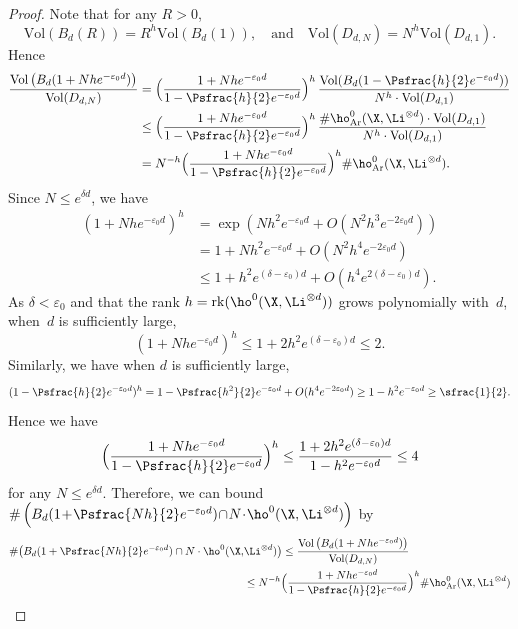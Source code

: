 \begin{proof}[Proof]
Note that for any $R>0$,
\[
\mathrm{Vol}\left(B_d(R)\right)=R^h\mathrm{Vol}\left(B_d(1)\right),
\quad\text{and}\quad
\mathrm{Vol}(D_{d,N})=N^{h} \mathrm{Vol}(D_{d,1}).
\]
Hence
\begin{align*}
\frac{\mathrm{Vol} \left(B_d(1+Nhe^{-\varepsilon_0 d}) \right)}{\mathrm{Vol}(D_{d,N})}
&=\Bigl(\frac{1+Nhe^{-\varepsilon_0 d}}{1-\Psfrac{h}{2}e^{-\varepsilon_0 d}}\Bigr)^h\,\frac{\mathrm{Vol}(B_d(1-\Psfrac{h}{2}e^{-\varepsilon_0 d}))}{N^h\cdot\mathrm{Vol}(D_{d,1})} \\
&\leq\Bigl(\frac{1+Nhe^{-\varepsilon_0 d}}{1-\Psfrac{h}{2}e^{-\varepsilon_0 d}}\Bigr)^h\,\frac{\#\ho^0_{\mathrm{Ar}}(\X,\Li^{\otimes d})\cdot \mathrm{Vol}(D_{d,1})}{N^{h}\cdot\mathrm{Vol}(D_{d,1})}\\
&=N^{-h}\Bigl(\frac{1+Nhe^{-\varepsilon_0 d}}{1-\Psfrac{h}{2}e^{-\varepsilon_0 d}}\Bigr)^h\#\ho^0_{\mathrm{Ar}}(\X,\Li^{\otimes d}).
\end{align*}
Since $N\leq e^{\delta d}$, we have
\begin{align*}
(1+Nhe^{-\varepsilon_0 d})^h &=\exp\left(Nh^2e^{-\varepsilon_0 d}+ O(N^2h^3e^{-2\varepsilon_0 d})\right)\\
&= 1+Nh^2e^{-\varepsilon_0 d}+O(N^2h^4e^{-2\varepsilon_0 d}) \\
&\leq 1+h^2e^{(\delta-\varepsilon_0) d}+O(h^4e^{2(\delta-\varepsilon_0) d}).
\end{align*}
As $\delta<\varepsilon_0$ and that the rank $h=\mathrm{rk}(\ho^0(\X,\Li^{\otimes d}))$ grows polynomially with~$d$, when~$d$ is sufficiently large,
\[
(1+Nhe^{-\varepsilon_0 d})^h \leq 1+2h^2e^{(\delta-\varepsilon_0) d}\leq 2.
\]
Similarly, we have when $d$ is sufficiently large,
\[
(1-\Psfrac{h}{2}e^{-\varepsilon_0 d})^h =1-\Psfrac{h^2}{2}e^{-\varepsilon_0 d}+O(h^4e^{-2\varepsilon_0 d})\geq 1-h^2e^{-\varepsilon_0 d}\geq \sfrac{1}{2}.
\]
Hence we have
\[
\Bigl(\frac{1+Nhe^{-\varepsilon_0 d}}{1-\Psfrac{h}{2}e^{-\varepsilon_0 d}}\Bigr)^h \leq \frac{1+2h^2e^{(\delta-\varepsilon_0) d}}{1-h^2e^{-\varepsilon_0 d}}\leq 4
\]
for any $N\!\leq\! e^{\delta d}$. Therefore, we can bound $\# \left(B_d(1\!+\!\Psfrac{Nh}{2}e^{-\varepsilon_0 d})\!\cap\! N\!\cdot\! \ho^0(\X,\Li^{\otimes d}) \right)$ by
\begin{align*}
\# \bigl(B_d(1+\Psfrac{Nh}{2}e^{-\varepsilon_0 d}) \cap N\cdot \ho^0(\X,&\Li^{\otimes d}) \bigr)
\leq \frac{\mathrm{Vol} \left(B_d(1+Nhe^{-\varepsilon_0 d}) \right)}{\mathrm{Vol}(D_{d,N})} \\
&\leq N^{-h}\Bigl(\frac{1+Nhe^{-\varepsilon_0 d}}{1-\Psfrac{h}{2}e^{-\varepsilon_0 d}} \Bigr)^h\#\ho^0_{\mathrm{Ar}}(\X,\Li^{\otimes d})\\

\end{align*}
\end{proof}
